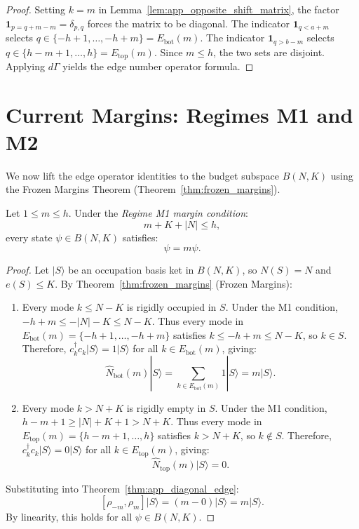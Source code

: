 \begin{proof}
Setting $k = m$ in Lemma~\ref{lem:app_opposite_shift_matrix}, the factor $\mathbf{1}_{p = q + m - m} = \delta_{p, q}$ forces the matrix to be diagonal.
The indicator $\mathbf{1}_{q < a + m}$ selects $q \in \{-h+1, \dots, -h+m\} = E_{\mathrm{bot}}(m)$.
The indicator $\mathbf{1}_{q > b - m}$ selects $q \in \{h-m+1, \dots, h\} = E_{\mathrm{top}}(m)$.
Since $m \le h$, the two sets are disjoint. Applying $d\Gamma$ yields the edge number operator formula.
\end{proof}

\section{Current Margins: Regimes M1 and M2}

We now lift the edge operator identities to the budget subspace $B(N, K)$ using the Frozen Margins Theorem (Theorem~\ref{thm:frozen_margins}).

\begin{theorem}
\label{thm:app_regime_m1}
Let $1 \le m \le h$. Under the \emph{Regime M1 margin condition}:
\begin{equation}
m + K + |N| \le h,
\end{equation}
every state $\psi \in B(N, K)$ satisfies:
\begin{equation}
[\rho_{-m}, \rho_m] \psi = m \psi.
\end{equation}
\end{theorem}

\begin{proof}
Let $|S\rangle$ be an occupation basis ket in $B(N, K)$, so $N(S) = N$ and $e(S) \le K$.
By Theorem~\ref{thm:frozen_margins} (Frozen Margins):
\begin{enumerate}
    \item Every mode $k \le N - K$ is rigidly occupied in $S$.
    Under the M1 condition, $-h + m \le -|N| - K \le N - K$.
    Thus every mode in $E_{\mathrm{bot}}(m) = \{-h+1, \dots, -h+m\}$ satisfies $k \le -h+m \le N-K$, so $k \in S$.
    Therefore, $c_k^\dagger c_k |S\rangle = 1 |S\rangle$ for all $k \in E_{\mathrm{bot}}(m)$, giving:
    \[
    \hat{N}_{\mathrm{bot}}(m) |S\rangle = \sum_{k \in E_{\mathrm{bot}}(m)} 1 |S\rangle = m |S\rangle.
    \]
    \item Every mode $k > N + K$ is rigidly empty in $S$.
    Under the M1 condition, $h - m + 1 \ge |N| + K + 1 > N + K$.
    Thus every mode in $E_{\mathrm{top}}(m) = \{h-m+1, \dots, h\}$ satisfies $k > N+K$, so $k \notin S$.
    Therefore, $c_k^\dagger c_k |S\rangle = 0 |S\rangle$ for all $k \in E_{\mathrm{top}}(m)$, giving:
    \[
    \hat{N}_{\mathrm{top}}(m) |S\rangle = 0.
    \]
\end{enumerate}
Substituting into Theorem~\ref{thm:app_diagonal_edge}:
\[
[\rho_{-m}, \rho_m] |S\rangle = (m - 0) |S\rangle = m |S\rangle.
\]
By linearity, this holds for all $\psi \in B(N, K)$.
\end{proof}


